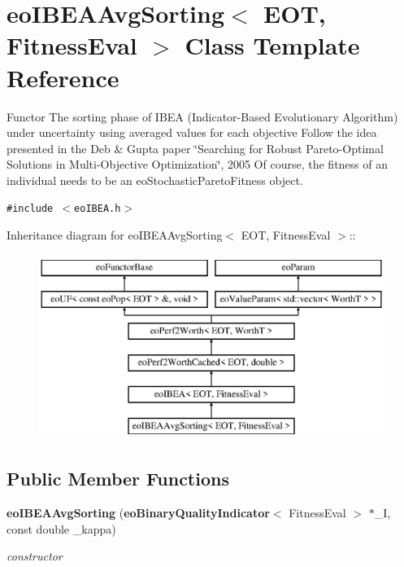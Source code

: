 \section{eo\-IBEAAvg\-Sorting$<$ EOT, Fitness\-Eval $>$ Class Template Reference}
\label{classeoIBEAAvgSorting}
Functor The sorting phase of IBEA (Indicator-Based Evolutionary Algorithm) under uncertainty using averaged values for each objective Follow the idea presented in the Deb \& Gupta paper \char`\"{}Searching for Robust Pareto-Optimal Solutions in Multi-Objective Optimization\char`\"{}, 2005 Of course, the fitness of an individual needs to be an eo\-Stochastic\-Pareto\-Fitness object.  


{\tt \#include $<$eo\-IBEA.h$>$}

Inheritance diagram for eo\-IBEAAvg\-Sorting$<$ EOT, Fitness\-Eval $>$::\begin{figure}[H]
\begin{center}
\leavevmode
\includegraphics[height=6cm]{classeoIBEAAvgSorting}
\end{center}
\end{figure}
\subsection*{Public Member Functions}
\begin{CompactItemize}
\item 
{\bf eo\-IBEAAvg\-Sorting} ({\bf eo\-Binary\-Quality\-Indicator}$<$ Fitness\-Eval $>$ $\ast$\_\-I, const double \_\-kappa)
\begin{CompactList}\small\item\em constructor \item\end{CompactList}\end{CompactItemize}
